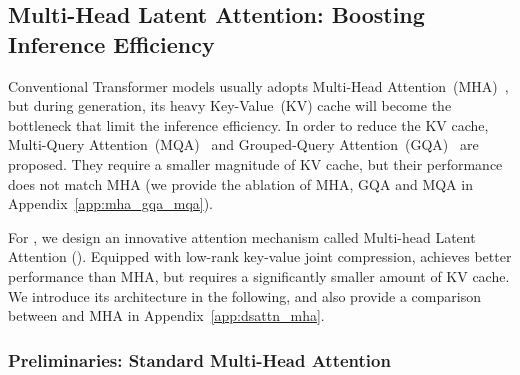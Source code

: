 \subsection{Multi-Head Latent Attention: Boosting Inference Efficiency}

Conventional Transformer models usually adopts Multi-Head Attention~(MHA)~\citep{transformer}, but during generation, its heavy Key-Value~(KV) cache will become the bottleneck that limit the inference efficiency. 
In order to reduce the KV cache, Multi-Query Attention~(MQA)~\citep{mqa} and Grouped-Query Attention~(GQA)~\citep{ainslie2023gqa} are proposed. 
They require a smaller magnitude of KV cache, but their performance does not match MHA (we provide the ablation of MHA, GQA and MQA in Appendix~\ref{app:mha_gqa_mqa}).

For \dsvii{}, we design an innovative attention mechanism called Multi-head Latent Attention (\dsattn{}). 
Equipped with low-rank key-value joint compression, \dsattn{} achieves better performance than MHA, but requires a significantly smaller amount of KV cache. 
We introduce its architecture in the following, and also provide a comparison between \dsattn{} and MHA in Appendix~\ref{app:dsattn_mha}. 

\subsubsection{Preliminaries: Standard Multi-Head Attention}


